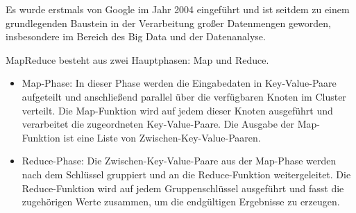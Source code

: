 Es wurde erstmals von Google im Jahr 2004 eingeführt und ist seitdem zu einem grundlegenden Baustein in der Verarbeitung großer Datenmengen geworden, insbesondere im Bereich des Big Data und der Datenanalyse.

MapReduce besteht aus zwei Hauptphasen: Map und Reduce.
\begin{itemize}  
\item Map-Phase: In dieser Phase werden die Eingabedaten in Key-Value-Paare aufgeteilt und anschließend parallel über die verfügbaren Knoten im Cluster verteilt. Die Map-Funktion wird auf jedem dieser Knoten ausgeführt und verarbeitet die zugeordneten Key-Value-Paare. Die Ausgabe der Map-Funktion ist eine Liste von Zwischen-Key-Value-Paaren.
\item Reduce-Phase: Die Zwischen-Key-Value-Paare aus der Map-Phase werden nach dem Schlüssel gruppiert und an die Reduce-Funktion weitergeleitet. Die Reduce-Funktion wird auf jedem Gruppenschlüssel ausgeführt und fasst die zugehörigen Werte zusammen, um die endgültigen Ergebnisse zu erzeugen.
\end{itemize}  

